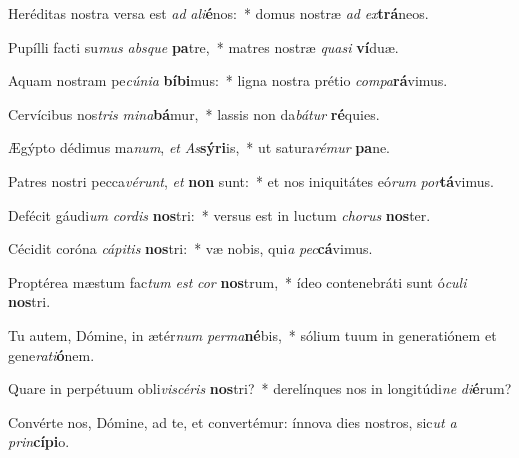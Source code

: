 \item Heréditas nostra versa est \textit{ad} \textit{a}\textit{li}\textbf{é}nos:~* domus nostræ \textit{ad} \textit{ex}\textbf{trá}neos.
\item Pupílli facti su\textit{mus} \textit{abs}\textit{que} \textbf{pa}tre,~* matres nostræ \textit{qua}\textit{si} \textbf{ví}duæ.
\item Aquam nostram pe\textit{cú}\textit{ni}\textit{a} \textbf{bí}\textbf{bi}mus:~* ligna nostra prétio \textit{com}\textit{pa}\textbf{rá}vimus.
\item Cervícibus nos\textit{tris} \textit{mi}\textit{na}\textbf{bá}mur,~* lassis non da\textit{bá}\textit{tur} \textbf{ré}quies.
\item Ægýpto dédimus ma\textit{num}, \textit{et} \textit{As}\textbf{sý}\textbf{ri}is,~* ut satura\textit{ré}\textit{mur} \textbf{pa}ne.
\item Patres nostri pecca\textit{vé}\textit{runt}, \textit{et} \textbf{non} sunt:~* et nos iniquitátes eó\textit{rum} \textit{por}\textbf{tá}vimus.
\item Defécit gáudi\textit{um} \textit{cor}\textit{dis} \textbf{nos}tri:~* versus est in luctum \textit{cho}\textit{rus} \textbf{nos}ter.
\item Cécidit coróna \textit{cá}\textit{pi}\textit{tis} \textbf{nos}tri:~* væ nobis, qui\textit{a} \textit{pec}\textbf{cá}vimus.
\item Proptérea mæstum fac\textit{tum} \textit{est} \textit{cor} \textbf{nos}trum,~* ídeo contenebráti sunt ó\textit{cu}\textit{li} \textbf{nos}tri.
\item Tu autem, Dómine, in ætér\textit{num} \textit{per}\textit{ma}\textbf{né}bis,~* sólium tuum in generatiónem et gene\textit{ra}\textit{ti}\textbf{ó}nem.
\item Quare in perpétuum obli\textit{vi}\textit{scé}\textit{ris} \textbf{nos}tri?~* derelínques nos in longitúdi\textit{ne} \textit{di}\textbf{é}rum?
\item Convérte nos, Dómine, ad te, et convertémur: ínnova dies nostros, sic\textit{ut} \textit{a} \textit{prin}\textbf{cí}\textbf{pi}o.
